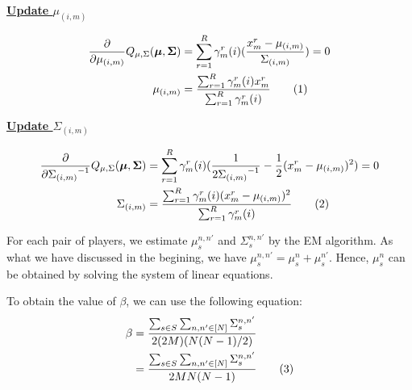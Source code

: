 \documentclass[12pt]{article}
\newcommand\numberthis{\addtocounter{equation}{1}\tag{\theequation}}
\newenvironment{problem}[2][Problem]{\begin{trivlist}
\item[\hskip \labelsep {\bfseries #1}\hskip \labelsep {\bfseries #2.}]}{\end{trivlist}}
\begin{document}
\begin{problem}{2.6.18}
\begin{flushleft}
    \textbf{\underline{Update $\mu_{(i,m)}$}}
\end{flushleft}

\begin{align*}
    \frac{\partial}{\partial \mu_{(i,m)}}Q_{\mu, \Sigma}(\bm{\mu}, \bm{\Sigma}) 
    &= \sum_{r=1}^{R} \gamma^{r}_{m}(i)(\frac{x^r_m - \mu_{(i,m)}}{\Sigma_{(i,m)}}) = 0 \\
    \mu_{(i,m)}
    &= \frac{\sum_{r=1}^{R}\gamma^{r}_{m}(i)x^r_m}{\sum_{r=1}^{R}\gamma^{r}_{m}(i)}
            \numberthis \label{eq:Q26-updateMu}
\end{align*}

\begin{flushleft}
    \textbf{\underline{Update $\Sigma_{(i,m)}$}}
\end{flushleft}

\begin{align*}
    \frac{\partial}{\partial {\Sigma_{(i,m)}}^{-1}}Q_{\mu, \Sigma}(\bm{\mu}, \bm{\Sigma}) 
    &= \sum_{r=1}^{R} \gamma^{r}_{m}(i)(\frac{1}{2{\Sigma_{(i,m)}}^{-1}} - \frac{1}{2}(x^r_m - \mu_{(i,m)})^2) = 0 \\
    \Sigma_{(i,m)}
    &= \frac{\sum_{r=1}^{R}\gamma^{r}_{m}(i)(x^r_m - \mu_{(i,m)})^2}
            {\sum_{r=1}^{R}\gamma^{r}_{m}(i)}  \numberthis \label{eq:Q26-updateSigma}
\end{align*}

For each pair of players, we estimate $\mu_s^{n,n'}$ and $\Sigma_s^{n,n'}$ by the
EM algorithm.
As what we have discussed in the begining, we have $\mu_s^{n,n'} = \mu_s^{n} + \mu_s^{n'}$.
Hence, $\mu_s^{n}$ can be obtained by solving the system of linear equations.

To obtain the value of $\beta$, we can use the following equation:
\begin{align*}
    \beta &= \frac{\sum_{s \in S}\sum_{n, n' \in [N]}\Sigma_s^{n,n'}}{2(2M)(N(N-1)/2)} \\
    &= \frac{\sum_{s \in S}\sum_{n, n' \in [N]}\Sigma_s^{n,n'}}{2 M N(N-1)} \numberthis \label{eq:Q26-beta}
\end{align*}
\end{problem}
\end{document}
